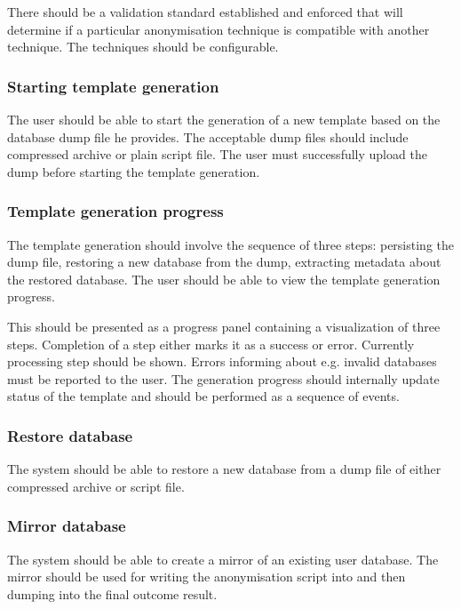 \documentclass[a4paper,twoside,12pt]{book}
\begin{document}
There should be a validation standard established and enforced that will determine if a particular anonymisation technique is compatible with another technique. The techniques should be configurable.

\subsubsection{Starting template generation}

The user should be able to start the generation of a new template based on the database dump file he provides. The acceptable dump files should include compressed archive or plain script file. The user must successfully upload the dump before starting the template generation.

\subsubsection{Template generation progress}

The template generation should involve the sequence of three steps: persisting the dump file, restoring a new database from the dump, extracting metadata about the restored database. The user should be able to view the template generation progress.

This should be presented as a progress panel containing a visualization of three steps. Completion of a step either marks it as a success or error. Currently processing step should be shown. Errors informing about e.g. invalid databases must be reported to the user. The generation progress should internally update status of the template and should be performed as a sequence of events.

\subsubsection{Restore database}

The system should be able to restore a new database from a dump file of either compressed archive or script file.

\subsubsection{Mirror database}

The system should be able to create a mirror of an existing user database. The mirror should be used for writing the anonymisation script into and then dumping into the final outcome result.
\end{document}
